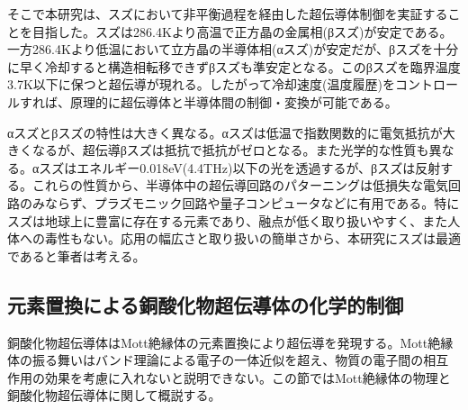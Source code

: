そこで本研究は、スズにおいて非平衡過程を経由した超伝導体制御を実証することを目指した。スズは286.4Kより高温で正方晶の金属相(βスズ)が安定である。一方286.4Kより低温において立方晶の半導体相(αスズ)が安定だが、βスズを十分に早く冷却すると構造相転移できずβスズも準安定となる。このβスズを臨界温度3.7K以下に保つと超伝導が現れる。したがって冷却速度(温度履歴)をコントロールすれば、原理的に超伝導体と半導体間の制御・変換が可能である。

αスズとβスズの特性は大きく異なる。αスズは低温で指数関数的に電気抵抗が大きくなるが、超伝導βスズは抵抗で抵抗がゼロとなる。また光学的な性質も異なる。αスズはエネルギー0.018eV(4.4THz)以下の光を透過するが、βスズは反射する。これらの性質から、半導体中の超伝導回路のパターニングは低損失な電気回路のみならず、プラズモニック回路や量子コンピュータなどに有用である。特にスズは地球上に豊富に存在する元素であり、融点が低く取り扱いやすく、また人体への毒性もない。応用の幅広さと取り扱いの簡単さから、本研究にスズは最適であると筆者は考える。

\subsection{元素置換による銅酸化物超伝導体の化学的制御}
銅酸化物超伝導体はMott絶縁体の元素置換により超伝導を発現する\cite{Lee2006}。Mott絶縁体の振る舞いはバンド理論による電子の一体近似を超え、物質の電子間の相互作用の効果を考慮に入れないと説明できない。この節ではMott絶縁体の物理と銅酸化物超伝導体に関して概説する。

